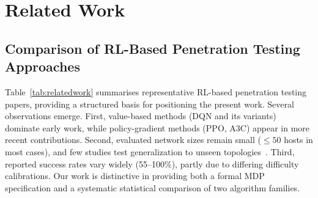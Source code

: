 \documentclass[conference]{IEEEtran}
\begin{document}
\section{Related Work}
\label{sec:related}

\subsection{Comparison of RL-Based Penetration Testing Approaches}

Table~\ref{tab:relatedwork} summarises representative RL-based
penetration testing papers, providing a structured basis for
positioning the present work.  Several observations emerge.  First,
value-based methods (DQN and its variants) dominate early work,
while policy-gradient methods (PPO, A3C) appear in more recent
contributions.  Second, evaluated network sizes remain small ($\leq
50$ hosts in most cases), and few studies test generalization to
unseen topologies~\cite{almajali2024applsci}.  Third, reported success rates vary widely (55--100\%),
partly due to differing difficulty calibrations.  Our work is
distinctive in providing both a formal MDP specification and a
systematic statistical comparison of two algorithm families.
\end{document}

